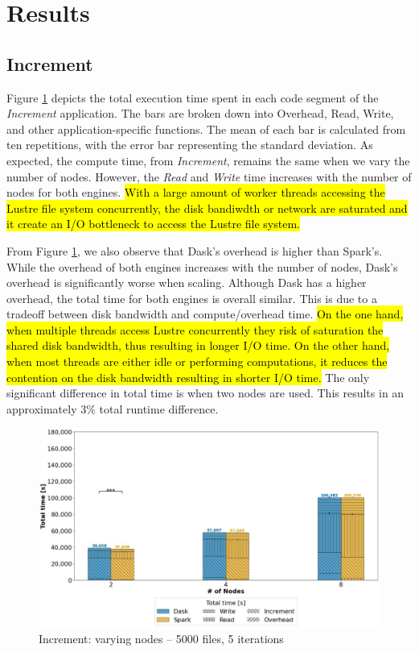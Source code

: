 \documentclass[AMA,STIX1COL]{WileyNJD-v2}
\newcommand{\HL}[1]{\hl{#1}}
\begin{document}
\section{Results}
\subsection{Increment}
Figure \ref{fig:increment_worker} depicts the total execution time spent in each code segment of the \textit{Increment} application.
The bars are broken down into Overhead, Read, Write, and other application-specific functions.
The mean of each bar is calculated from ten repetitions, with the error bar representing the standard deviation.
As expected, the compute time, from \textit{Increment}, remains the same when we vary the number of nodes.
However, the \textit{Read} and \textit{Write} time increases with the number of nodes for both engines.
\HL{
	With a large amount of worker threads accessing the Lustre file system
	concurrently, the disk bandiwdth or network are saturated and it create 
	an I/O bottleneck to access the Lustre file system.
}
												
From Figure \ref{fig:increment_worker}, we also observe that Dask's overhead is higher than Spark's.
While the overhead of both engines increases with the number of nodes, Dask's overhead is significantly worse when scaling.
Although Dask has a higher overhead, the total time for both engines is overall similar.
This is due to a tradeoff between disk bandwidth and compute/overhead time.
\HL{
	On the one hand, when multiple threads access Lustre concurrently they risk 
	of saturation the shared disk bandwidth, thus resulting in longer I/O time.
	On the other hand, when most threads are either idle or performing computations,
	it reduces the contention on the disk bandwidth resulting in shorter I/O time.
}
The only significant difference in total time is when two nodes are used.
This results in an approximately 3\% total runtime difference.
\begin{figure}[!h]
	\centering
	\includegraphics[clip,width=0.75\columnwidth]{figures/stacked_increment_worker.jpg}
	\caption{Increment: varying nodes -- 5000 files, 5 iterations}
	\label{fig:increment_worker}
\end{figure}
														
\end{document}
